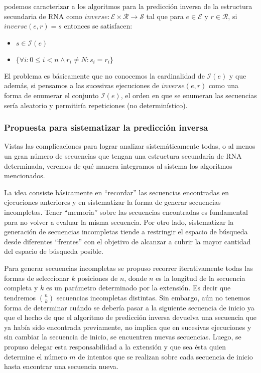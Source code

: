podemos caracterizar a los algoritmos para la predicci\'on inversa de la
estructura secundaria de \ac{RNA} como $inverse: \mathcal{E} \times \mathcal{R}
\rightarrow \mathcal{S}$ tal que para $e \in \mathcal{E}$ y $r \in
\mathcal{R}$, si $inverse(e,r) = s$ entonces se satisfacen:

\begin{itemize}
  \item $s \in \mathcal{I}(e)$
  \item $\{\forall i : 0 \leq i < n \land r_{i} \neq N : s_{i} = r_{i}\}$ 
\end{itemize}

El problema es b\'asicamente que no conocemos la cardinalidad de
$\mathcal{I}(e)$ y que adem\'as, si pensamos a las sucesivas ejecuciones de
$inverse(e,r)$ como una forma de enumerar el conjunto $\mathcal{I}(e)$, el orden
en que se enumeran las secuencias ser\'ia aleatorio y permitir\'ia repeticiones
(no determin\'istico).

\subsubsection{Propuesta para sistematizar la predicci\'on inversa}

Vistas las complicaciones para lograr analizar sistem\'aticamente todas, o al
menos un gran n\'umero de secuencias que tengan una estructura secundaria de
\ac{RNA} determinada, veremos de qu\'e manera integramos al sistema los
algoritmos mencionados.

La idea consiste b\'asicamente en ``recordar'' las secuencias encontradas en
ejecuciones anteriores y en sistematizar la forma de generar secuencias
incompletas. Tener ``memoria'' sobre las secuencias encontradas es fundamental
para no volver a evaluar la misma secuencia. Por otro lado, sistematizar la
generaci\'on de secuencias incompletas tiende a restringir el espacio de
b\'usqueda desde diferentes ``frentes'' con el objetivo de alcanzar a cubrir la
mayor cantidad del espacio de b\'usqueda posible.

Para generar secuencias incompletas se propuso recorrer iterativamente todas
las formas de seleccionar $k$ posiciones de $n$, donde $n$ es la longitud de la
secuencia completa y $k$ es un par\'ametro determinado por la extensi\'on. Es
decir que tendremos $n \choose k$ secuencias incompletas distintas. Sin
embargo, a\'un no tenemos forma de determinar cu\'ando se deber\'ia pasar a la
siguiente secuencia de inicio ya que el hecho de que el algoritmo de
predicci\'on inversa devuelva una secuencia que ya hab\'ia sido encontrada
previamente, no implica que en sucesivas ejecuciones y sin cambiar la secuencia
de inicio, se encuentren nuevas secuencias. Luego, se propuso delegar esta
responsabilidad a la extensi\'on y que sea \'esta quien determine el n\'umero
$m$ de intentos que se realizan sobre cada secuencia de inicio hasta encontrar
una secuencia nueva.

